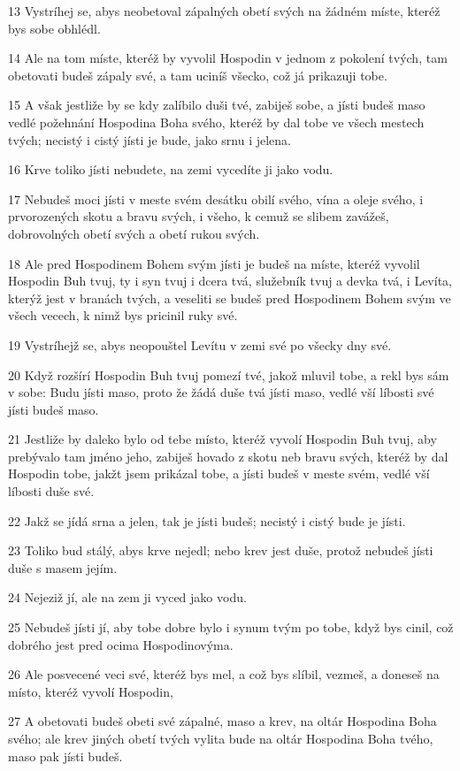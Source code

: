 \par 13 Vystríhej se, abys neobetoval zápalných obetí svých na žádném míste, kteréž bys sobe obhlédl.
\par 14 Ale na tom míste, kteréž by vyvolil Hospodin v jednom z pokolení tvých, tam obetovati budeš zápaly své, a tam uciníš všecko, což já prikazuji tobe.
\par 15 A však jestliže by se kdy zalíbilo duši tvé, zabiješ sobe, a jísti budeš maso vedlé požehnání Hospodina Boha svého, kteréž by dal tobe ve všech mestech tvých; necistý i cistý jísti je bude, jako srnu i jelena.
\par 16 Krve toliko jísti nebudete, na zemi vycedíte ji jako vodu.
\par 17 Nebudeš moci jísti v meste svém desátku obilí svého, vína a oleje svého, i prvorozených skotu a bravu svých, i všeho, k cemuž se slibem zavážeš, dobrovolných obetí svých a obetí rukou svých.
\par 18 Ale pred Hospodinem Bohem svým jísti je budeš na míste, kteréž vyvolil Hospodin Buh tvuj, ty i syn tvuj i dcera tvá, služebník tvuj a devka tvá, i Levíta, kterýž jest v branách tvých, a veseliti se budeš pred Hospodinem Bohem svým ve všech vecech, k nimž bys pricinil ruky své.
\par 19 Vystríhejž se, abys neopouštel Levítu v zemi své po všecky dny své.
\par 20 Když rozšírí Hospodin Buh tvuj pomezí tvé, jakož mluvil tobe, a rekl bys sám v sobe: Budu jísti maso, proto že žádá duše tvá jísti maso, vedlé vší líbosti své jísti budeš maso.
\par 21 Jestliže by daleko bylo od tebe místo, kteréž vyvolí Hospodin Buh tvuj, aby prebývalo tam jméno jeho, zabiješ hovado z skotu neb bravu svých, kteréž by dal Hospodin tobe, jakžt jsem prikázal tobe, a jísti budeš v meste svém, vedlé vší líbosti duše své.
\par 22 Jakž se jídá srna a jelen, tak je jísti budeš; necistý i cistý bude je jísti.
\par 23 Toliko bud stálý, abys krve nejedl; nebo krev jest duše, protož nebudeš jísti duše s masem jejím.
\par 24 Nejeziž jí, ale na zem ji vyced jako vodu.
\par 25 Nebudeš jísti jí, aby tobe dobre bylo i synum tvým po tobe, když bys cinil, což dobrého jest pred ocima Hospodinovýma.
\par 26 Ale posvecené veci své, kteréž bys mel, a což bys slíbil, vezmeš, a doneseš na místo, kteréž vyvolí Hospodin,
\par 27 A obetovati budeš obeti své zápalné, maso a krev, na oltár Hospodina Boha svého; ale krev jiných obetí tvých vylita bude na oltár Hospodina Boha tvého, maso pak jísti budeš.
